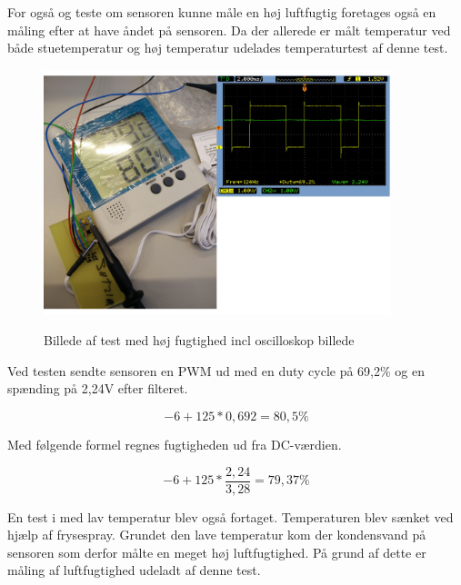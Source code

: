 For også og teste om sensoren kunne måle en høj luftfugtig foretages også en måling efter at have åndet på sensoren. Da der allerede er målt temperatur ved både stuetemperatur og høj temperatur udelades temperaturtest af denne test. 

\begin{figure}[h]
\centering
{\includegraphics[width=0.90\textwidth]{filer/modultest/Billeder/test_fugtig}}
\caption{Billede af test med høj fugtighed incl oscilloskop billede}
\label{lab:test_fugtig}
\end{figure}

Ved testen sendte sensoren en PWM ud med en duty cycle på 69,2\% og en spænding på 2,24V efter filteret. 


\begin{equation}
-6+125*0,692= 80,5\%
\end{equation}

Med følgende formel regnes fugtigheden ud fra DC-værdien.

\begin{equation}
-6+125*\frac{2,24}{3,28}= 79,37\%
\end{equation}


En test i med lav temperatur blev også fortaget. Temperaturen blev sænket ved hjælp af frysespray. Grundet den lave temperatur kom der kondensvand på sensoren som derfor målte en meget høj luftfugtighed. På grund af dette er måling af luftfugtighed udeladt af denne test. 


